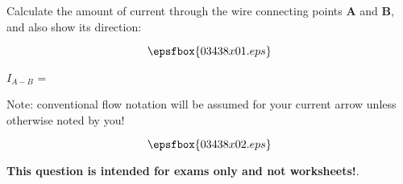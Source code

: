 

Calculate the amount of current through the wire connecting points {\bf A} and {\bf B}, and also show its direction:

$$\epsfbox{03438x01.eps}$$

$I_{A-B}$ = 

\vskip 10pt

Note: conventional flow notation will be assumed for your current arrow unless otherwise noted by you!







$$\epsfbox{03438x02.eps}$$







{\bf This question is intended for exams only and not worksheets!}.



